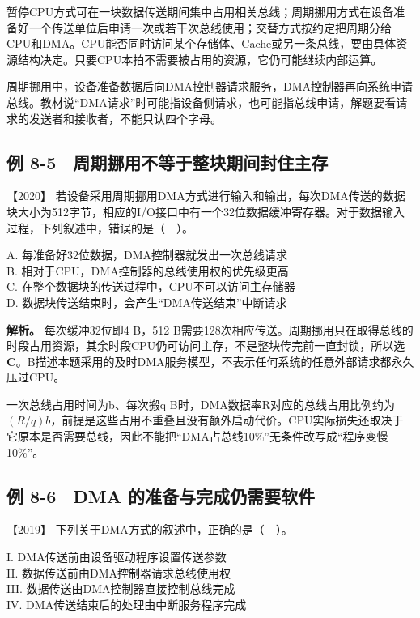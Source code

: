 暂停CPU方式可在一块数据传送期间集中占用相关总线；周期挪用方式在设备准备好一个传送单位后申请一次或若干次总线使用；交替方式按约定把周期分给CPU和DMA。CPU能否同时访问某个存储体、Cache或另一条总线，要由具体资源结构决定。只要CPU本拍不需要被占用的资源，它仍可能继续内部运算。

周期挪用中，设备准备数据后向DMA控制器请求服务，DMA控制器再向系统申请总线。教材说``DMA请求''时可能指设备侧请求，也可能指总线申请，解题要看请求的发送者和接收者，不能只认四个字母。

\subsection{例 8-5　周期挪用不等于整块期间封住主存}\label{co-ex8-5}

\noindent{}【2020】 若设备采用周期挪用DMA方式进行输入和输出，每次DMA传送的数据块大小为512字节，相应的I/O接口中有一个32位数据缓冲寄存器。对于数据输入过程，下列叙述中，错误的是（　）。

A. 每准备好32位数据，DMA控制器就发出一次总线请求\\
B. 相对于CPU，DMA控制器的总线使用权的优先级更高\\
C. 在整个数据块的传送过程中，CPU不可以访问主存储器\\
D. 数据块传送结束时，会产生``DMA传送结束''中断请求


\textbf{解析。} 每次缓冲32位即4 B，512 B需要128次相应传送。周期挪用只在取得总线的时段占用资源，其余时段CPU仍可访问主存，不是整块传完前一直封锁，所以选 \textbf{C}。B描述本题采用的及时DMA服务模型，不表示任何系统的任意外部请求都永久压过CPU。

一次总线占用时间为b、每次搬q B时，DMA数据率R对应的总线占用比例约为 \((R/q)b\)，前提是这些占用不重叠且没有额外启动代价。CPU实际损失还取决于它原本是否需要总线，因此不能把``DMA占总线10\%''无条件改写成``程序变慢10\%''。

\subsection{例 8-6　DMA 的准备与完成仍需要软件}\label{co-ex8-6}

\noindent{}【2019】 下列关于DMA方式的叙述中，正确的是（　）。

I. DMA传送前由设备驱动程序设置传送参数\\
II. 数据传送前由DMA控制器请求总线使用权\\
III. 数据传送由DMA控制器直接控制总线完成\\
IV. DMA传送结束后的处理由中断服务程序完成

